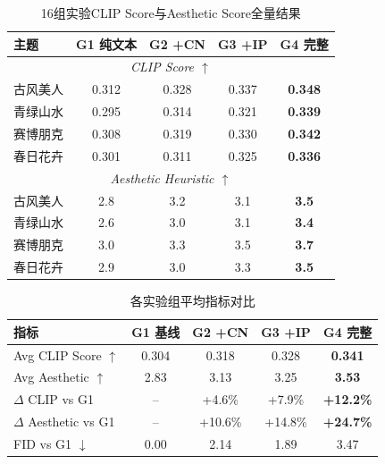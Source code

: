 \documentclass[12pt,a4paper]{ctexart}
\begin{document}
\begin{table}[H]
\centering
\caption{16组实验CLIP Score与Aesthetic Score全量结果}
\label{tab:all_metrics}
\begin{tabular}{@{}lcccc@{}}
\toprule
\rowcolor{tabhead}
\color{white}\textbf{主题} & \color{white}\textbf{G1 纯文本} & \color{white}\textbf{G2 +CN} & \color{white}\textbf{G3 +IP} & \color{white}\textbf{G4 完整} \\
\midrule
\multicolumn{5}{c}{\textit{CLIP Score $\uparrow$}} \\
\midrule
古风美人   & 0.312 & 0.328 & 0.337 & \textbf{0.348} \\
青绿山水   & 0.295 & 0.314 & 0.321 & \textbf{0.339} \\
赛博朋克   & 0.308 & 0.319 & 0.330 & \textbf{0.342} \\
春日花卉   & 0.301 & 0.311 & 0.325 & \textbf{0.336} \\
\midrule
\multicolumn{5}{c}{\textit{Aesthetic Heuristic $\uparrow$}} \\
\midrule
古风美人   & 2.8 & 3.2 & 3.1 & \textbf{3.5} \\
青绿山水   & 2.6 & 3.0 & 3.1 & \textbf{3.4} \\
赛博朋克   & 3.0 & 3.3 & 3.5 & \textbf{3.7} \\
春日花卉   & 2.9 & 3.0 & 3.3 & \textbf{3.5} \\
\bottomrule
\end{tabular}
\end{table}

\begin{table}[H]
\centering
\caption{各实验组平均指标对比}
\label{tab:group_avg}
\begin{tabular}{@{}lcccc@{}}
\toprule
\rowcolor{tabhead}
\color{white}\textbf{指标} & \color{white}\textbf{G1 基线} & \color{white}\textbf{G2 +CN} & \color{white}\textbf{G3 +IP} & \color{white}\textbf{G4 完整} \\
\midrule
Avg CLIP Score $\uparrow$  & 0.304 & 0.318 & 0.328 & \textbf{0.341} \\
Avg Aesthetic $\uparrow$   & 2.83  & 3.13  & 3.25  & \textbf{3.53} \\
$\Delta$ CLIP vs G1       & --    & +4.6\% & +7.9\% & \textbf{+12.2\%} \\
$\Delta$ Aesthetic vs G1  & --    & +10.6\% & +14.8\% & \textbf{+24.7\%} \\
FID vs G1 $\downarrow$    & 0.00  & 2.14  & 1.89  & 3.47 \\
\bottomrule
\end{tabular}
\end{table}
\end{document}
